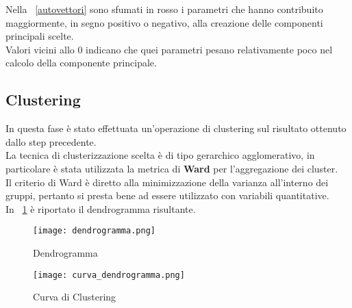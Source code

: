 Nella \figurename~\ref{autovettori} sono sfumati in rosso i parametri che
hanno contribuito maggiormente, in segno positivo o negativo, alla creazione
delle componenti principali scelte.\\
Valori vicini allo 0 indicano che quei parametri pesano relativamente poco nel
calcolo della componente principale.\\

\clearpage
\subsection{Clustering}
In questa fase è stato effettuata un'operazione di clustering sul risultato
ottenuto dallo step precedente.\\
La tecnica di clusterizzazione scelta è di tipo gerarchico agglomerativo,
in particolare è stata utilizzata la metrica di \textbf{Ward} per l'aggregazione
dei cluster.\\
Il criterio di Ward è diretto alla minimizzazione della varianza all’interno dei gruppi,
pertanto si presta bene ad essere utilizzato con variabili quantitative.\\
In \figurename~\ref{dendrogramma} è riportato il dendrogramma risultante.\\

\begin{figure}[!htbp]
	\texttt{[image: dendrogramma.png]}
  \caption{Dendrogramma}
  \label{dendrogramma}
\end{figure}
\clearpage
\begin{figure}[!htbp]
	\texttt{[image: curva\_dendrogramma.png]}
  \caption{Curva di Clustering}
  \label{curva_dendrogramma}
\end{figure}


